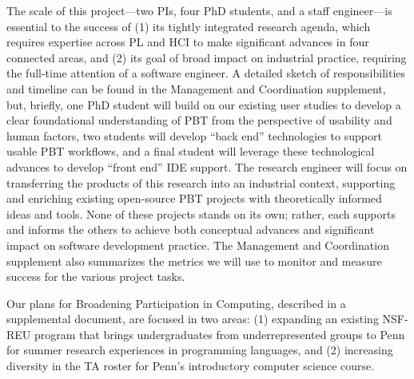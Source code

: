 %
The scale of this project---two PIs, four PhD students, and a staff
engineer---is essential to the success of (1) its
tightly integrated research agenda, which requires expertise across PL and
HCI to make significant advances in four connected areas, and (2) its
goal of broad impact on industrial
practice, requiring the full-time attention of a software engineer.
%
A detailed sketch of responsibilities and timeline can be found in the
Management and Coordination supplement, but, briefly,
one PhD student will build on our existing user studies to
develop a clear foundational understanding of
PBT from the perspective of usability and human factors, two students
will develop ``back end'' technologies to support usable
PBT workflows, and a final student will leverage these technological
advances to develop ``front end'' IDE support. The
research engineer will focus on transferring the
products of this research into an industrial context, supporting and enriching
existing open-source PBT projects with theoretically informed ideas
and tools. None of these
projects stands on its own; rather, each supports and informs the
others to achieve both conceptual advances and significant
impact on software development practice.
%
The Management and Coordination supplement also summarizes the metrics
we will use to monitor and measure success for the various project
tasks.



Our plans for Broadening Participation in Computing, described in a
supplemental document, are focused in two areas: (1) expanding an
existing NSF-REU program that brings undergraduates from
underrepresented groups to Penn for summer research experiences in
programming languages, and (2) increasing diversity in the TA roster
for Penn's introductory computer science course.

\iflater
{}
\fi

